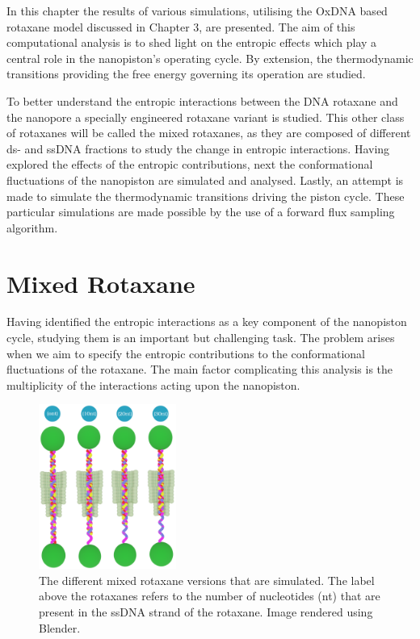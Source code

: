 \noindent In this chapter the results of various simulations, utilising the OxDNA based
rotaxane model discussed in Chapter 3, are presented. The aim of this computational
analysis is to shed light on
the entropic effects which play a central role in the nanopiston's operating cycle. By
extension, the thermodynamic transitions providing the free energy governing its
operation are studied.

To better understand the entropic interactions between the DNA rotaxane and the nanopore
a specially engineered rotaxane variant is studied. This other class of rotaxanes will be
called the mixed rotaxanes, as they are composed of different ds- and ssDNA fractions to
study the change in entropic interactions. Having explored the effects of the
entropic contributions, next the conformational fluctuations of the nanopiston are
simulated and analysed. Lastly, an attempt is made to simulate the thermodynamic
transitions driving the piston cycle. These particular simulations are made possible
by the use of a forward flux sampling algorithm.


\section{Mixed Rotaxane}



Having identified the entropic interactions as a key component of the nanopiston cycle,
studying them is an important but challenging task. The problem arises when we aim to
specify the entropic contributions to the conformational fluctuations of the rotaxane.
The main factor complicating this analysis is the multiplicity of the interactions acting
upon the nanopiston.

\begin{figure}
  \vspace{-0.8cm}
  \begin{center}
    \includegraphics[width=0.4\textwidth]{Figures/mixed.png}
    \caption[Figure of the simulated mixed rotaxanes.]{{\small The different mixed
    rotaxane versions that are simulated. The label above the rotaxanes refers to the
    number of nucleotides (nt) that are present in the ssDNA strand of the rotaxane.
Image rendered using Blender.\cite{blender}}}
  \label{fig:mixed}
\end{center}
\end{figure}

